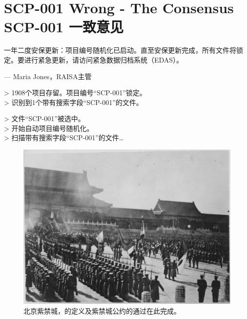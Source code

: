 \chapter[SCP-001 一致意见]{
	SCP-001 Wrong - The Consensus \\
	SCP-001 一致意见
}

\label{chap:SCP-001.the.consensus}


\begin{scpbox}[colback=ftwoftwoctwo, center upper]


一年二度安保更新：项目编号随机化已启动。直至安保更新完成，所有文件将锁定。要进行紧急更新，请访问紧急数据归档系统（EDAS）。

— Maria Jones，RAISA主管

\end{scpbox}

\hr

\begin{scpboxcmd}

> 1908个项目存留。项目编号“SCP-001”锁定。 \\
> 识别到1个带有搜索字段“SCP-001”的文件。

> 文件“SCP-001”被选中。 \\
> 开始自动项目编号随机化。 \\
> 扫描带有搜索字段“SCP-001”的文件…

\end{scpboxcmd}

\hr

\begin{figure}[H]
	\centering
	\includegraphics{images/SCP-001-the-consensus.jpg}
	\caption*{北京紫禁城，的定义及紫禁城公约的通过在此完成。}
\end{figure}

